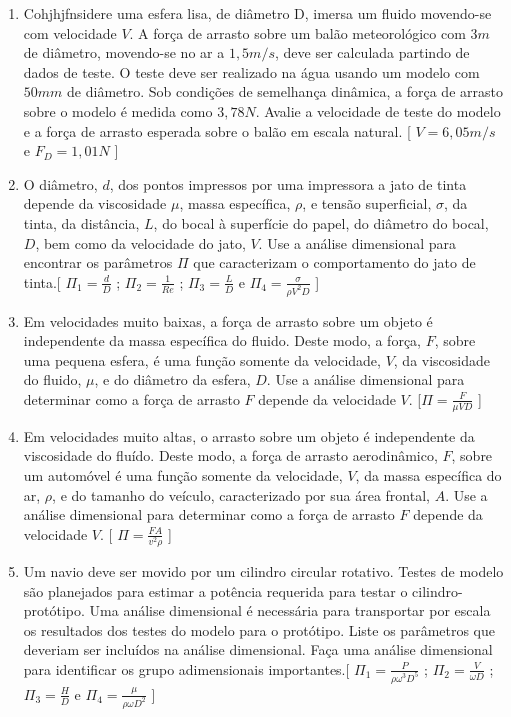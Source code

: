 \documentclass[a4paper,12pt]{article}
\begin{document}
\begin{enumerate}
{\[ f \approx 7.18 \times 10^7 Hz\]

So, the frequency of the cyclotron is approximately \(7.18 \times 10^7\) Hz.}



\newpage

\item Cohjhjfnsidere uma esfera lisa, de diâmetro D, imersa um fluido movendo-se com velocidade $V$. A força de arrasto sobre um balão meteorológico com $3 m$ de diâmetro, movendo-se no ar a $1,5 m/s$, deve ser calculada partindo de dados de teste. O teste deve ser realizado na água usando um modelo com $50 mm$ de diâmetro. Sob condições de semelhança dinâmica, a força de arrasto sobre o modelo é medida como $3,78 N$. Avalie a velocidade de teste do modelo e a força de arrasto esperada sobre o balão em escala natural. [ \scriptsize{$V = 6,05 m/s$ e $F_{D} = 1,01 N$ \normalsize ]} \normalsize  
\item O diâmetro, $d$, dos pontos impressos por uma impressora a jato de tinta depende da viscosidade $\mu$, massa específica, $\rho$, e tensão superficial, $\sigma$, da tinta, da distância, $L$, do bocal à superfície do papel, do diâmetro do bocal, $D$, bem como da velocidade do jato, $V$. Use a análise dimensional para encontrar os parâmetros $\Pi$ que caracterizam o comportamento do jato de tinta.[ \scriptsize{$\Pi_1 = \frac{d}{D}$ ; $\Pi_2 = \frac{1}{Re}$ ; $\Pi_3 = \frac{L}{D}$ e $\Pi_4 = \frac{\sigma}{\rho V^2 D}$ \normalsize ]} \normalsize 
\item Em velocidades muito baixas, a força de arrasto sobre um objeto é independente da massa específica do fluido. Deste modo, a força, $F$, sobre uma pequena esfera, é uma função somente da velocidade, $V$, da viscosidade do fluido, $\mu$, e do diâmetro da esfera, $D$. Use a análise dimensional para determinar como a força de arrasto $F$ depende da velocidade $V$. [\scriptsize{$\Pi = \frac{F}{\mu V D}$ \normalsize ]} \normalsize 
\item Em velocidades muito altas, o arrasto sobre um objeto é independente da viscosidade do fluído. Deste modo, a força de arrasto aerodinâmico, $F$, sobre um automóvel é uma função somente da velocidade, $V$, da massa específica do ar, $\rho$, e do tamanho do veículo, caracterizado por sua área frontal, $A$. Use a análise dimensional para determinar como a força de arrasto $F$ depende da velocidade $V$. [ \scriptsize{$\Pi =  \frac{F A}{v^2 \rho}$ \normalsize ]} \normalsize 
\item Um navio deve ser movido por um cilindro circular rotativo. Testes de modelo são planejados para estimar a potência requerida para testar o cilindro-protótipo. Uma análise dimensional é necessária para transportar por escala os resultados dos testes do modelo para o protótipo. Liste os parâmetros que deveriam ser incluídos na análise dimensional. Faça uma análise dimensional para identificar os grupo adimensionais importantes.[ \scriptsize{$\Pi_1 =  \frac{P}{\rho \omega^3 D^5}$ ; $\Pi_2 =  \frac{V}{\omega D}$ ; $\Pi_3 =  \frac{H}{D}$ e $\Pi_4 =  \frac{\mu}{\rho \omega D^2}$ \normalsize ]} \normalsize 

\end{enumerate}
\end{document}
